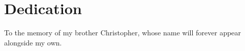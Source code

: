 \chapter*{Dedication}


\par To the memory of my brother Christopher, whose name will forever appear alongside my own.
